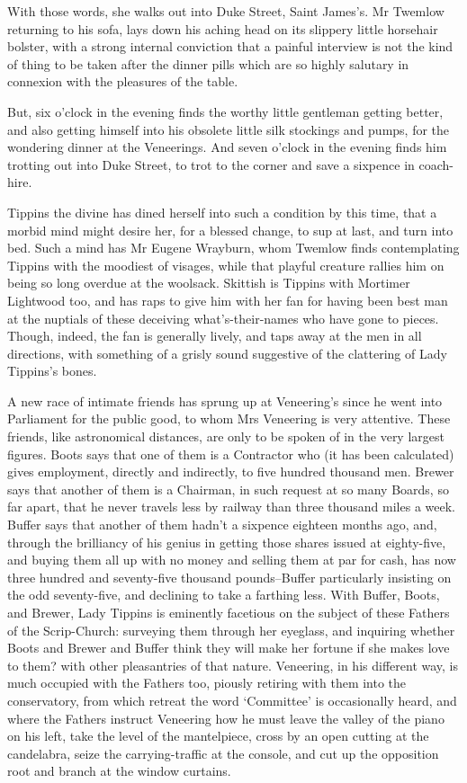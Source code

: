 With those words, she walks out into Duke Street, Saint James’s. Mr
Twemlow returning to his sofa, lays down his aching head on its slippery
little horsehair bolster, with a strong internal conviction that a
painful interview is not the kind of thing to be taken after the dinner
pills which are so highly salutary in connexion with the pleasures of
the table.

But, six o’clock in the evening finds the worthy little gentleman
getting better, and also getting himself into his obsolete little silk
stockings and pumps, for the wondering dinner at the Veneerings. And
seven o’clock in the evening finds him trotting out into Duke Street, to
trot to the corner and save a sixpence in coach-hire.

Tippins the divine has dined herself into such a condition by this time,
that a morbid mind might desire her, for a blessed change, to sup
at last, and turn into bed. Such a mind has Mr Eugene Wrayburn, whom
Twemlow finds contemplating Tippins with the moodiest of visages,
while that playful creature rallies him on being so long overdue at the
woolsack. Skittish is Tippins with Mortimer Lightwood too, and has raps
to give him with her fan for having been best man at the nuptials of
these deceiving what’s-their-names who have gone to pieces. Though,
indeed, the fan is generally lively, and taps away at the men in
all directions, with something of a grisly sound suggestive of the
clattering of Lady Tippins’s bones.

A new race of intimate friends has sprung up at Veneering’s since he
went into Parliament for the public good, to whom Mrs Veneering is very
attentive. These friends, like astronomical distances, are only to be
spoken of in the very largest figures. Boots says that one of them is a
Contractor who (it has been calculated) gives employment, directly and
indirectly, to five hundred thousand men. Brewer says that another of
them is a Chairman, in such request at so many Boards, so far apart,
that he never travels less by railway than three thousand miles a week.
Buffer says that another of them hadn’t a sixpence eighteen months ago,
and, through the brilliancy of his genius in getting those shares issued
at eighty-five, and buying them all up with no money and selling them
at par for cash, has now three hundred and seventy-five thousand
pounds--Buffer particularly insisting on the odd seventy-five, and
declining to take a farthing less. With Buffer, Boots, and Brewer, Lady
Tippins is eminently facetious on the subject of these Fathers of the
Scrip-Church: surveying them through her eyeglass, and inquiring whether
Boots and Brewer and Buffer think they will make her fortune if she
makes love to them? with other pleasantries of that nature. Veneering,
in his different way, is much occupied with the Fathers too, piously
retiring with them into the conservatory, from which retreat the word
‘Committee’ is occasionally heard, and where the Fathers instruct
Veneering how he must leave the valley of the piano on his left,
take the level of the mantelpiece, cross by an open cutting at the
candelabra, seize the carrying-traffic at the console, and cut up the
opposition root and branch at the window curtains.

